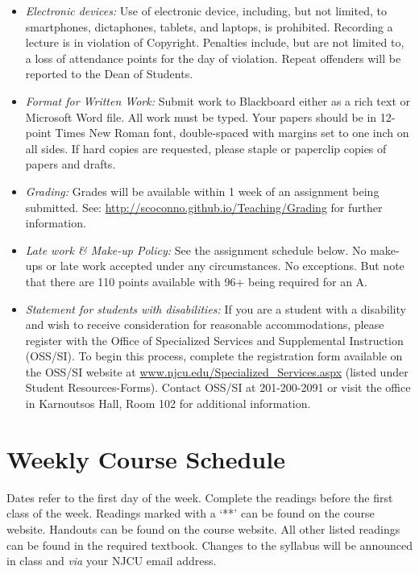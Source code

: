 \documentclass[article,oneside]{memoir}
\begin{document}
\begin{itemize}
\item \textit{Electronic devices:} Use of electronic device, including, but not limited, to smartphones, dictaphones, tablets, and laptops, is prohibited. Recording a lecture is in violation of Copyright. Penalties include, but are not limited to, a loss of attendance points for the day of violation. Repeat offenders will be reported to the Dean of Students.

\item \textit{Format for Written Work:} Submit work to Blackboard either as a rich text or Microsoft Word file. All work must be typed. Your papers should be in 12-point Times New Roman font, double-spaced with margins set to one inch on all sides. If hard copies are requested, please staple or paperclip copies of papers and drafts.



\item \textit{Grading:} Grades will be available within 1 week of an assignment being submitted. See: \href{http://scoconno.github.io/Teaching/Grading}{http://scoconno.github.io/Teaching/Grading} for further information.


\item \textit{Late work \& Make-up Policy:} See the assignment schedule below. No make-ups or late work accepted under any circumstances. No exceptions. But note that there are 110 points available with 96+ being required for an A.


\item \textit{Statement for students with disabilities:} If you are a student with a disability and wish to receive consideration for reasonable accommodations, please register with the Office of Specialized Services and Supplemental Instruction (OSS/SI). To begin this process, complete the registration form available on the OSS/SI website at
\href{http://www.njcu.edu/Specialized_Services.aspx}{www.njcu.edu/Specialized\_Services.aspx}
(listed under Student Resources-Forms). Contact OSS/SI at 201-200-2091
or visit the office in Karnoutsos Hall, Room 102 for additional
information.

\end{itemize}



\section{Weekly Course Schedule}
Dates refer to the first day of the week. Complete the readings before the first class of the week. Readings marked with a `**' can be found on the course website. Handouts can be found on the course website. All other listed readings can be found in the required textbook. Changes to the syllabus will be announced in class and \emph{via} your NJCU email address.
\end{document}
